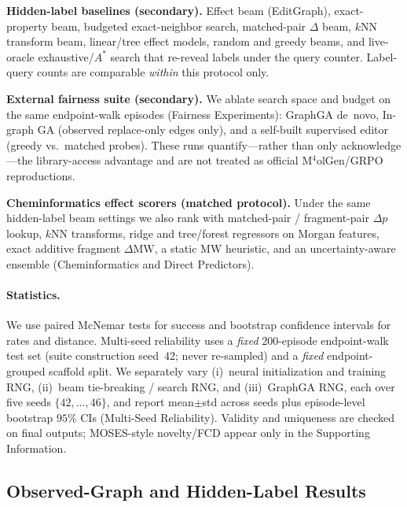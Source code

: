 \documentclass[journal=jcisd8,manuscript=article,email=false]{achemso}
\begin{document}
\textbf{Hidden-label baselines (secondary).} Effect beam (EditGraph), exact-property beam, budgeted exact-neighbor search, matched-pair $\Delta$ beam, $k$NN transform beam, linear/tree effect models, random and greedy beams, and live-oracle exhaustive/$A^\ast$ search that re-reveal labels under the query counter. Label-query counts are comparable \emph{within} this protocol only.

\textbf{External fairness suite (secondary).} We ablate search space and budget on the same endpoint-walk episodes (Fairness Experiments): GraphGA de~novo, In-graph GA (observed replace-only edges only), and a self-built supervised editor (greedy vs.\ matched probes). These runs quantify---rather than only acknowledge---the library-access advantage and are not treated as official M$^4$olGen/GRPO reproductions.

\textbf{Cheminformatics effect scorers (matched protocol).} Under the same hidden-label beam settings we also rank with matched-pair / fragment-pair $\Delta p$ lookup, $k$NN transforms, ridge and tree/forest regressors on Morgan features, exact additive fragment $\Delta\mathrm{MW}$, a static MW heuristic, and an uncertainty-aware ensemble (Cheminformatics and Direct Predictors).

\paragraph{Statistics.}
We use paired McNemar tests for success and bootstrap confidence intervals for rates and distance. Multi-seed reliability uses a \emph{fixed} 200-episode endpoint-walk test set (suite construction seed~42; never re-sampled) and a \emph{fixed} endpoint-grouped scaffold split. We separately vary (i)~neural initialization and training RNG, (ii)~beam tie-breaking / search RNG, and (iii)~GraphGA RNG, each over five seeds $\{42,\ldots,46\}$, and report mean$\pm$std across seeds plus episode-level bootstrap $95\%$ CIs (Multi-Seed Reliability). Validity and uniqueness are checked on final outputs; MOSES-style novelty/FCD appear only in the Supporting Information.

\subsection{Observed-Graph and Hidden-Label Results}
\end{document}
